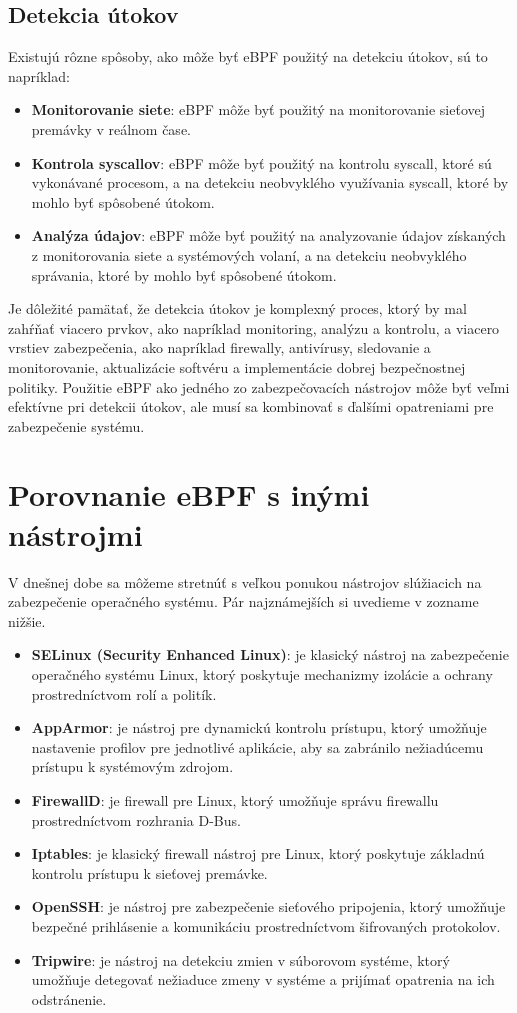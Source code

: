 \subsection{Detekcia útokov}
Existujú rôzne spôsoby, ako môže byť eBPF použitý na detekciu útokov, sú to napríklad:
\begin{itemize}
    \item \textbf{Monitorovanie siete}: eBPF môže byť použitý na monitorovanie sieťovej premávky v reálnom čase.
    \item \textbf{Kontrola syscallov}: eBPF môže byť použitý na kontrolu syscall, ktoré sú vykonávané procesom, a na detekciu neobvyklého využívania syscall, 
    ktoré by mohlo byť spôsobené útokom.
    \item \textbf{Analýza údajov}: eBPF môže byť použitý na analyzovanie údajov získaných z monitorovania siete a systémových volaní, a na detekciu 
    neobvyklého správania, ktoré by mohlo byť spôsobené útokom.    
\end{itemize}
Je dôležité pamätať, že detekcia útokov je komplexný proces, ktorý by mal zahŕňať viacero prvkov, ako napríklad monitoring, analýzu a kontrolu, 
a viacero vrstiev zabezpečenia, ako napríklad firewally, antivírusy, sledovanie a monitorovanie, aktualizácie softvéru a implementácie dobrej 
bezpečnostnej politiky. Použitie eBPF ako jedného zo zabezpečovacích nástrojov môže byť veľmi efektívne pri detekcii útokov, ale musí 
sa kombinovať s ďalšími opatreniami pre zabezpečenie systému.

\section{Porovnanie eBPF s inými nástrojmi} 
V dnešnej dobe sa môžeme stretnúť s veľkou ponukou nástrojov slúžiacich na zabezpečenie operačného systému. 
Pár najznámejších si uvedieme v zozname nižšie.  
\begin{itemize}
    \item \textbf{SELinux (Security Enhanced Linux)}: je klasický nástroj na zabezpečenie operačného systému Linux, ktorý poskytuje mechanizmy 
    izolácie a ochrany prostredníctvom rolí a politík.
    \item \textbf{AppArmor}: je nástroj pre dynamickú kontrolu prístupu, ktorý umožňuje nastavenie profilov pre jednotlivé aplikácie, 
    aby sa zabránilo nežiadúcemu prístupu k systémovým zdrojom.
    \item \textbf{FirewallD}: je firewall pre Linux, ktorý umožňuje správu firewallu prostredníctvom rozhrania D-Bus.
    \item \textbf{Iptables}: je klasický firewall nástroj pre Linux, ktorý poskytuje základnú kontrolu prístupu k sieťovej premávke.
    \item \textbf{OpenSSH}: je nástroj pre zabezpečenie sieťového pripojenia, ktorý umožňuje bezpečné prihlásenie a komunikáciu 
    prostredníctvom šifrovaných protokolov.
    \item \textbf{Tripwire}: je nástroj na detekciu zmien v súborovom systéme, ktorý umožňuje detegovať nežiaduce zmeny v 
    systéme a prijímať opatrenia na ich odstránenie.
\end{itemize}


